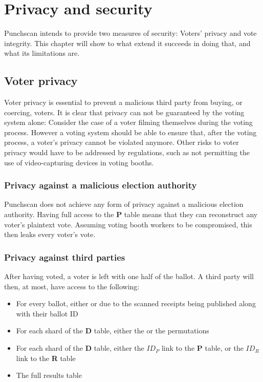 \chapter{Privacy and security}
\label{ch:security}

Punchscan intends to provide two measures of security: Voters' privacy and vote
integrity. This chapter will show to what extend it succeeds in doing that, and
what its limitations are.

\section{Voter privacy}

Voter privacy is essential to prevent a malicious third party from buying, or
coercing, voters. It is clear that privacy can not be guaranteed by the voting
system alone: Consider the case of a voter filming themselves during the voting
process. However a voting system should be able to ensure that, after the
voting process, a voter's privacy cannot be violated anymore. Other risks to
voter privacy would have to be addressed by regulations, such as not
permitting the use of video-capturing devices in voting booths.

\subsection{Privacy against a malicious election authority}

Punchscan does not achieve any form of privacy against a malicious election
authority. Having full access to the \textbf{P} table means that they can
reconstruct any voter's plaintext vote. Assuming voting booth workers to be
compromised, this then leaks every voter's vote.

\subsection{Privacy against third parties}

After having voted, a voter is left with one half of the ballot. A third party
will then, at most, have access to the following:
\begin{itemize}
\item For every ballot, either \ptop{} or \pbottom{} due to the scanned receipts being published along with their ballot ID
\item For each shard of the \textbf{D} table, either the \pone{} or the \ptwo{}
permutations
\item For each shard of the \textbf{D} table, either the $ID_P$ link to the
\textbf{P} table, or the $ID_R$ link to the \textbf{R} table
\item The full results table
\end{itemize}


